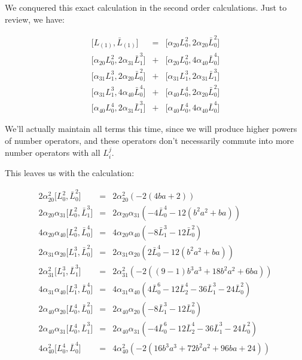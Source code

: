 \documentclass{article}
\newcommand{\lrbrack}[2]{\lbrack #1 , #2 \rbrack}
\begin{document}
We conquered this exact calculation in the second order calculations.  Just to review, we have:

\begin{eqnarray*}
\lrbrack{L_{(1)}}{\bar{L}_{(1)}} &=& \lrbrack{\alpha_{20}L_0^2}{2\alpha_{20}\bar{L}_0^2} \\
\lrbrack{\alpha_{20}L_0^2}{2\alpha_{31}\bar{L}_1^3}
& + &
\lrbrack{\alpha_{20}L_0^2}{4\alpha_{40}\bar{L}_0^4} \\
\lrbrack{\alpha_{31}L_1^3}{2\alpha_{20}\bar{L}_0^2}
& + & 
\lrbrack{\alpha_{31}L_1^3}{2\alpha_{31}\bar{L}_1^3}\\
\lrbrack{\alpha_{31}L_1^3}{4\alpha_{40}\bar{L}_0^4}
& + &
\lrbrack{\alpha_{40}L_0^4}{2\alpha_{20}\bar{L}_0^2}\\
\lrbrack{\alpha_{40}L_0^4}{2\alpha_{31}\bar{L}_1^3}
& + &
\lrbrack{\alpha_{40}L_0^4}{4\alpha_{40}\bar{L}_0^4}
\end{eqnarray*}


We'll actually maintain all terms this time, since we will produce higher powers of number operators, and these operators don't necessarily commute into more number operators with all $L_i^j$.


This leaves us with the calculation:

\begin{eqnarray*}
2\alpha_{20}^2 \lrbrack{L_0^2}{\bar{L}_0^2} & = & 2\alpha_{20}^2 (-2(4ba + 2))\\
2\alpha_{20}\alpha_{31} \lrbrack{L_0^2}{\bar{L}_1^3} & = & 2\alpha_{20}\alpha_{31} (-4\bar{L}_0^4 -12(b^2a^2 + ba))\\
4\alpha_{20}\alpha_{40} \lrbrack{L_0^2}{\bar{L}_0^4} & = & 4\alpha_{20}\alpha_{40}(-8\bar{L}_1^3 - 12 \bar{L}_0^2) \\
2\alpha_{31}\alpha_{20} \lrbrack{L_1^3}{\bar{L}_0^2} & = & 2\alpha_{31}\alpha_{20} (2\bar{L}_0^4 - 12(b^2a^2 + ba))\\
2\alpha_{31}^2 \lrbrack{L_1^3}{\bar{L}_1^3} & = & 2\alpha_{31}^2 (-2((9-1)b^3a^3 + 18 b^2a^2 + 6 ba))\\
4\alpha_{31}\alpha_{40} \lrbrack{L_1^3}{\bar{L}_0^4} & = & 4\alpha_{31}\alpha_{40} (4\bar{L}_0^6 - 12 \bar{L}_2^4 -36 \bar{L}_1^3 - 24 \bar{L}_0^2)\\
2\alpha_{40}\alpha_{20} \lrbrack{L_0^4}{\bar{L}_0^2} & = & 2\alpha_{40}\alpha_{20}( -8\bar{L}_1^3 - 12 \bar{L}_0^2 ) \\
2\alpha_{40}\alpha_{31} \lrbrack{L_0^4}{\bar{L}_1^3} & = & 2\alpha_{40}\alpha_{31} (-4\bar{L}_0^6 - 12 \bar{L}_2^4 -36 \bar{L}_1^3 - 24 \bar{L}_0^2)\\
4\alpha_{40}^2 \lrbrack{L_0^4}{\bar{L}_0^4} & = & 4\alpha_{40}^2(-2(16b^3a^3 + 72 b^2a^2 + 96 ba + 24))\\
\end{eqnarray*}
\end{document}
